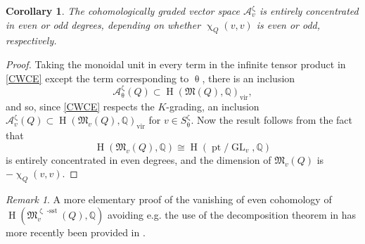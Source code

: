\documentclass{amsart}
\DeclareMathOperator{\sst}{-sst}
\DeclareMathOperator{\pt}{pt}
\newcommand{\Mst}{\mathfrak{M}}
\newcommand{\QQ}{\mathbb{Q}}
\DeclareMathOperator{\HO}{H}
\DeclareMathOperator{\vir}{vir}
\DeclareMathOperator{\GL}{GL}
\renewcommand{\theta}{\uptheta}
\renewcommand{\zeta}{\upzeta}
\renewcommand{\chi}{\upchi}
\theoremstyle{plain}%
\newtheorem{cor}[thm]{Corollary}
\theoremstyle{definition}
\theoremstyle{remark}
\newtheorem{rmk}[thm]{Remark}
\begin{document}
\begin{cor}\label{par_cor}
The cohomologically graded vector space $\mathcal{A}_v^{\zeta}$ is entirely concentrated in even or odd degrees, depending on whether $\chi_Q(v,v)$ is even or odd, respectively. 
\end{cor}
\begin{proof}
Taking the monoidal unit in every term in the infinite tensor product in \eqref{CWCE} except the term corresponding to $\theta$, there is an inclusion
\[
\mathcal{A}_{\theta}^{\zeta}(Q)\subset \HO(\Mst(Q),\mathbb{Q})_{\vir},
\]
and so, since \eqref{CWCE} respects the $K$-grading, an inclusion  $\mathcal{A}_{v}^{\zeta}(Q)\subset \HO(\Mst_v(Q),\mathbb{Q})_{\vir}$ for $v\in S^{\zeta}_{\theta}$.  Now the result follows from the fact that 
\[
\HO(\Mst_v(Q),\mathbb{Q})\cong \HO(\pt/\GL_v,\mathbb{Q})
\]
is entirely concentrated in even degrees, and the dimension of $\Mst_v(Q)$ is $-\chi_Q(v,v)$.
\end{proof}
\begin{rmk}
A more elementary proof of the vanishing of even cohomology of $\HO(\Mst^{\zeta\sst}_v(Q),\QQ)$ avoiding e.g. the use of the decomposition theorem in \cite{DavMei} has more recently been provided in \cite[Thm 5.1]{FraRei}. 
\end{rmk}
\end{document}
